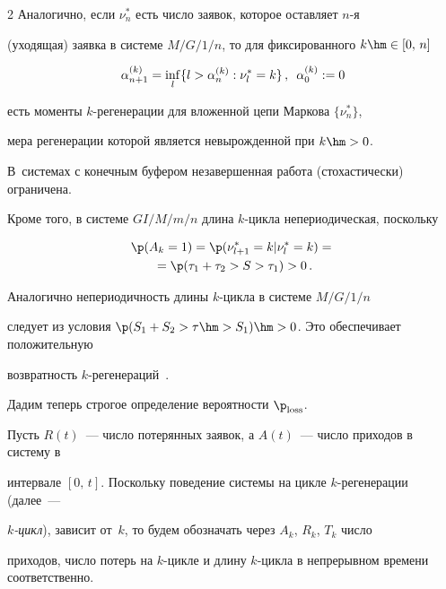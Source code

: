 \begin{multicols}{2}
Аналогично, если $\nu_n^*$ есть число заявок, которое оставляет $n$-я


(уходящая)  заявка в системе  $M/G/1/n$,  то для фиксированного $k\hm\in[0,\,n]$


 \begin{equation*}


\alpha^{(k)}_{n+1}=\inf\limits_l\{l>\alpha^{(k)}_{n}: \nu_l^*=k\}\,,


\enskip\alpha^{(k)}_{0}:=0


 \end{equation*}


 есть  моменты $k$-регенерации для вложенной  цепи Маркова $\{\nu_n^*\}$, 


 мера регенерации которой   является невырожденной при $k\hm>0$.


 В~сис\-те\-мах с конечным буфером   незавершенная работа  (стохастически) ограничена.


Кроме того, в системе $GI/M/m/n$  длина $k$-цик\-ла непериодическая, поскольку


\begin{multline*}


\p(A_k=1)=\p(\nu^*_{l+1}=k|\nu^*_l=k)={}\\


{}=\p(\tau_1+\tau_2>S>\tau_1)>0\,.


\end{multline*}


Аналогично непериодичность длины $k$-цик\-ла в сис\-те\-ме $M/G/1/n$


следует из условия $\p(S_1+S_2>\tau\hm>S_1)\hm>0$.  Это обеспечивает положительную


 возвратность  $k$-ре\-ге\-не\-ра\-ций~\cite{MorozovDelgado}.


 


 \pagebreak





Дадим теперь строгое определение веро\-ят\-ности $\p_{\mathrm{loss}}$.


 Пусть $R(t)$~--- число потерянных заявок, а $A(t)$~--- число приходов в систему в


интервале $[0,\,t]$.  Поскольку поведение системы на цикле $k$-ре\-ге\-не\-ра\-ции (далее~--- 


{\it $k$-цикл}), зависит от~$k$, то  будем  обозначать  через $A_k$, $R_k$, $T_k$ число


приходов, число потерь на $k$-цик\-ле и  длину $k$-цик\-ла в непрерывном времени соответственно.



\end{multicols}
